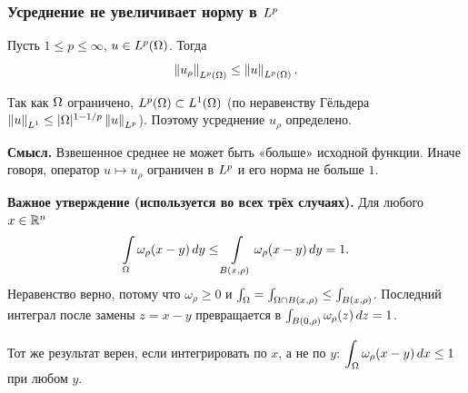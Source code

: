 \subsubsection*{Усреднение не увеличивает норму в $L^{p}$}

\begin{theorem}\label{thm:norm}
Пусть $1 \le p \le \infty$, $u \in L^{p}(\Omega)$. Тогда
\[
  \left\lVert u_\rho \right\rVert_{L^{p}(\Omega)} \le \left\lVert u \right\rVert_{L^{p}(\Omega)} .
\]
\end{theorem}

\begin{idea}
Так как $\Omega$ ограничено, $L^{p}(\Omega) \subset L^{1}(\Omega)$ (по неравенству Гёльдера
$\left\lVert u \right\rVert_{L^{1}} \le |\Omega|^{1-1/p}\left\lVert u \right\rVert_{L^{p}}$). Поэтому усреднение $u_\rho$
определено.

\medskip
\textbf{Смысл.} Взвешенное среднее не может быть «больше» исходной функции. Иначе говоря,
оператор $u \mapsto u_\rho$ ограничен в $L^{p}$ и его норма не больше $1$.
\end{idea}

\textbf{Важное утверждение (используется во всех трёх случаях).} Для любого $x \in \mathbb{R}^n$
\begin{equation}\label{eq:star}
  \int\limits_{\Omega} \omega_\rho(x - y)\, dy \le \int\limits_{B(x,\rho)} \omega_\rho(x - y)\, dy = 1 .
\end{equation}
Неравенство верно, потому что $\omega_\rho \ge 0$ и
$\int_\Omega = \int_{\Omega\cap B(x,\rho)} \le \int_{B(x,\rho)}$. Последний интеграл
после замены $z = x - y$ превращается в $\int_{B(0,\rho)}\omega_\rho(z)\,dz = 1$.

Тот же результат верен, если интегрировать по $x$, а не по $y$:
$\displaystyle\int_\Omega \omega_\rho(x-y)\,dx \le 1$ при любом $y$.

